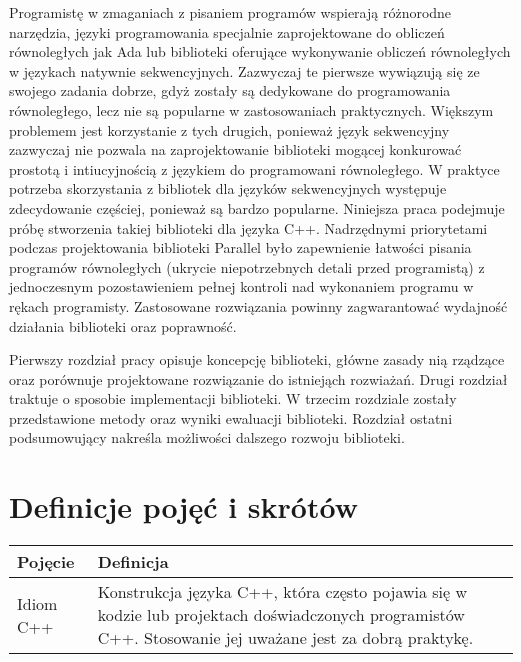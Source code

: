   Programistę w zmaganiach z pisaniem programów wspierają różnorodne narzędzia, języki programowania specjalnie zaprojektowane do obliczeń równoległych jak Ada lub biblioteki oferujące wykonywanie obliczeń równoległych
  w językach natywnie sekwencyjnych.
  Zazwyczaj te pierwsze wywiązują się ze swojego zadania dobrze, gdyż zostały są dedykowane do programowania równoległego, lecz nie są popularne w zastosowaniach praktycznych.
  Większym problemem jest korzystanie z tych drugich, ponieważ język sekwencyjny zazwyczaj nie pozwala na zaprojektowanie biblioteki mogącej konkurować prostotą i intiucyjnością z językiem do programowani równoległego.
  W praktyce potrzeba skorzystania z bibliotek dla języków sekwencyjnych występuje zdecydowanie częściej, ponieważ są bardzo popularne.
  Niniejsza praca podejmuje próbę stworzenia takiej biblioteki dla języka C++.
  Nadrzędnymi priorytetami podczas projektowania biblioteki Parallel było zapewnienie łatwości pisania programów równoległych (ukrycie niepotrzebnych detali przed programistą) z jednoczesnym pozostawieniem pełnej kontroli 
  nad wykonaniem programu w rękach programisty. Zastosowane rozwiązania powinny zagwarantować wydajność działania biblioteki oraz poprawność.

  Pierwszy rozdział pracy opisuje koncepcję biblioteki, główne zasady nią rządzące oraz porównuje projektowane rozwiązanie do istniejąch rozwiażań.
  Drugi rozdział traktuje o sposobie implementacji biblioteki.
  W trzecim rozdziale zostały przedstawione metody oraz wyniki ewaluacji biblioteki.
  Rozdział ostatni podsumowujący nakreśla możliwości dalszego rozwoju biblioteki.

\section*{Definicje pojęć i skrótów}
\begin{tabular}{ | l | l |}
  \hline
  \textbf{Pojęcie} & \textbf{Definicja} \\ \hline
  Idiom C++& Konstrukcja języka C++, która często pojawia się w kodzie lub projektach doświadczonych programistów C++. Stosowanie jej uważane jest za dobrą praktykę.\\ \hline
  
  \hline
\end{tabular} 
